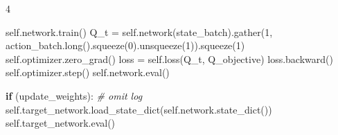 \documentclass{article}
\newenvironment{Shaded}{\CodeFontSize\setlength{\topsep}{\CodeBlockSkip}\setlength{\partopsep}{0pt}}{}
\newcommand{\BuiltInTok}[1]{\textcolor[rgb]{0.00,0.50,0.00}{#1}}
\newcommand{\CommentTok}[1]{\textcolor[rgb]{0.38,0.63,0.69}{\textit{#1}}}
\newcommand{\ControlFlowTok}[1]{\textcolor[rgb]{0.00,0.44,0.13}{\textbf{#1}}}
\newcommand{\DecValTok}[1]{\textcolor[rgb]{0.25,0.63,0.44}{#1}}
\newcommand{\NormalTok}[1]{#1}
\newcommand{\OperatorTok}[1]{\textcolor[rgb]{0.40,0.40,0.40}{#1}}
\newcommand{\VariableTok}[1]{\textcolor[rgb]{0.10,0.09,0.49}{#1}}
\newcommand{\CodeFontSize}{\fontsize{3.6}{4}\selectfont}
\newlength{\CodeBlockSkip}
\newcommand{\NumCodeColumns}{4}  %
\begin{document}
\begin{multicols*}{\NumCodeColumns}
\begin{Shaded}
\begin{Highlighting}[]
  \VariableTok{self}\NormalTok{.network.train()}
\NormalTok{  Q\_t }\OperatorTok{=} \VariableTok{self}\NormalTok{.network(state\_batch).gather(}\DecValTok{1}\NormalTok{, action\_batch.}\BuiltInTok{long}\NormalTok{().squeeze(}\DecValTok{0}\NormalTok{).unsqueeze(}\DecValTok{1}\NormalTok{)).squeeze(}\DecValTok{1}\NormalTok{)}
  \VariableTok{self}\NormalTok{.optimizer.zero\_grad()}
\NormalTok{  loss }\OperatorTok{=} \VariableTok{self}\NormalTok{.loss(Q\_t, Q\_objective)}
\NormalTok{  loss.backward()}
  \VariableTok{self}\NormalTok{.optimizer.step()}
  \VariableTok{self}\NormalTok{.network.}\BuiltInTok{eval}\NormalTok{()}

  \ControlFlowTok{if}\NormalTok{ (update\_weights): }\CommentTok{\# omit log}
    \VariableTok{self}\NormalTok{.target\_network.load\_state\_dict(}\VariableTok{self}\NormalTok{.network.state\_dict())}
    \VariableTok{self}\NormalTok{.target\_network.}\BuiltInTok{eval}\NormalTok{()}
\end{Highlighting}
\end{Shaded}


\end{multicols*}
\end{document}
